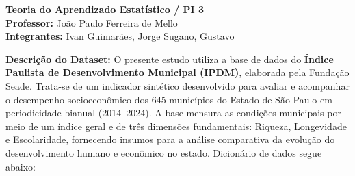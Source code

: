 \documentclass[12pt]{article}
\begin{document}
\begin{center}
    {\fontsize{15pt}{18pt}\selectfont \textbf{Teoria do Aprendizado Estatístico / PI 3}}\\[0.2cm]
    {\fontsize{11pt}{14pt}\selectfont \textbf{Professor:} João Paulo Ferreira de Mello}\\[0.1cm]
    {\fontsize{11pt}{14pt}\selectfont \textbf{Integrantes:} Ivan Guimarães, Jorge Sugano, Gustavo}\\[0.3cm]
\end{center}

\noindent
\fontsize{10pt}{13pt}\selectfont
\textbf{Descrição do Dataset:} O presente estudo utiliza a base de dados do \textbf{Índice Paulista de Desenvolvimento Municipal (IPDM)}, elaborada pela Fundação Seade. Trata-se de um indicador sintético desenvolvido para avaliar e acompanhar o desempenho socioeconômico dos 645 municípios do Estado de São Paulo em periodicidade bianual (2014--2024). A base mensura as condições municipais por meio de um índice geral e de três dimensões fundamentais: Riqueza, Longevidade e Escolaridade, fornecendo insumos para a análise comparativa da evolução do desenvolvimento humano e econômico no estado. Dicionário de dados segue abaixo:

\vspace{0.25cm}
\end{document}
